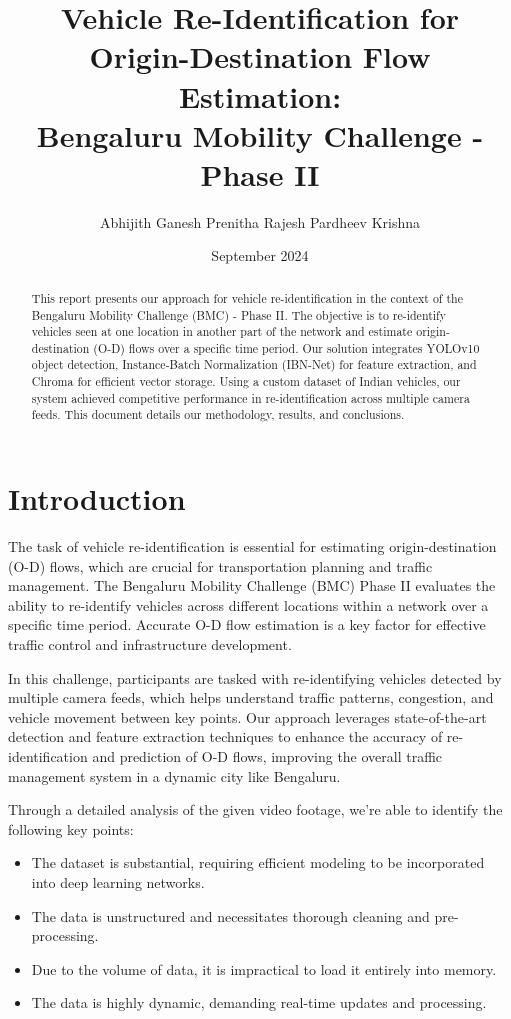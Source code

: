 \documentclass[11pt]{IEEEtran}
\title{\textbf{\Large Vehicle Re-Identification for Origin-Destination Flow
        Estimation:} \\
    \large Bengaluru Mobility Challenge - Phase II}
\author{
    Abhijith Ganesh
    Prenitha Rajesh
    Pardheev Krishna
}
\date{September 2024}
\begin{document}
\maketitle
\begin{abstract}
    This report presents our approach for vehicle re-identification in the
    context of the Bengaluru Mobility Challenge (BMC) - Phase II. The objective
    is
    to re-identify vehicles seen at one location in another part of the network
    and
    estimate origin-destination (O-D) flows over a specific time period. Our
    solution integrates YOLOv10 object detection, Instance-Batch Normalization
    (IBN-Net) for feature extraction, and Chroma for efficient vector storage.
    Using a custom dataset of Indian vehicles, our system achieved competitive
    performance in re-identification across multiple camera feeds. This
    document
    details our methodology, results, and conclusions.
\end{abstract}

\section{Introduction}
The task of vehicle re-identification is essential for estimating
origin-destination (O-D) flows, which are crucial for transportation planning
and traffic management. The Bengaluru Mobility Challenge (BMC) Phase II
evaluates the ability to re-identify vehicles across different locations within
a network over a specific time period. Accurate O-D flow estimation is a key
factor for effective traffic control and infrastructure development.

In this challenge, participants are tasked with re-identifying vehicles
detected by multiple camera feeds, which helps understand traffic patterns,
congestion, and vehicle movement between key points. Our approach leverages
state-of-the-art detection and feature extraction techniques to enhance the
accuracy of re-identification and prediction of O-D flows, improving the
overall traffic management system in a dynamic city like Bengaluru.

Through a detailed analysis of the given video footage, we're able to identify
the following key points:
\begin{itemize}
    \item The dataset is substantial, requiring efficient modeling to be
          incorporated into deep learning networks.
    \item The data is unstructured and necessitates thorough cleaning and
          pre-processing.
    \item Due to the volume of data, it is impractical to load it entirely into
          memory.
    \item The data is highly dynamic, demanding real-time updates and
          processing.
\end{itemize}
\end{document}
